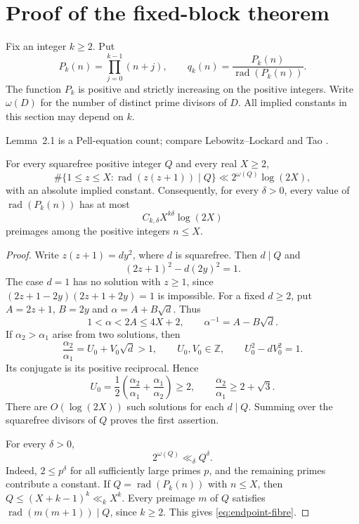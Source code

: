 \section{Proof of the fixed-block theorem}\label{sec:fixed-block}

Fix an integer $k\ge2$. Put
\[
P_k(n)=\prod_{j=0}^{k-1}(n+j),\qquad
q_k(n)=\frac{P_k(n)}{\operatorname{rad}(P_k(n))}.
\]
The function $P_k$ is positive and strictly increasing on the positive
integers. Write $\omega(D)$ for the number of distinct prime divisors of
$D$. All implied constants in this section may depend on $k$.

Lemma~2.1 is a Pell-equation count; compare Lebowitz--Lockard
\cite[Lemma~8]{LL2025} and Tao \cite[Lemma~2.10]{Tao2026}.

\begin{lemma}\label{lem:support-fibre}
For every squarefree positive integer $Q$ and every real $X\ge2$,
\[
\#\{1\le z\le X:\operatorname{rad}(z(z+1))\mid Q\}
\ll 2^{\omega(Q)}\log(2X),
\]
with an absolute implied constant. Consequently, for every $\delta>0$,
every value of $\operatorname{rad}(P_k(n))$ has at most
\begin{equation}\label{eq:endpoint-fibre}
C_{k,\delta}X^{k\delta}\log(2X)
\end{equation}
preimages among the positive integers $n\le X$.
\end{lemma}

\begin{proof}
Write $z(z+1)=dy^2$, where $d$ is squarefree. Then $d\mid Q$ and
\[
(2z+1)^2-d(2y)^2=1.
\]
The case $d=1$ has no solution with $z\ge1$, since
$(2z+1-2y)(2z+1+2y)=1$ is impossible. For a fixed $d\ge2$, put
$A=2z+1$, $B=2y$ and $\alpha=A+B\sqrt d$. Thus
\[
1<\alpha<2A\le4X+2,\qquad \alpha^{-1}=A-B\sqrt d.
\]
If $\alpha_2>\alpha_1$ arise from two solutions, then
\[
\frac{\alpha_2}{\alpha_1}=U_0+V_0\sqrt d>1,
\qquad U_0,V_0\in\mathbb Z,\qquad U_0^2-dV_0^2=1.
\]
Its conjugate is its positive reciprocal. Hence
\[
U_0=\frac12\left(\frac{\alpha_2}{\alpha_1}
                 +\frac{\alpha_1}{\alpha_2}\right)\ge2,
\qquad
\frac{\alpha_2}{\alpha_1}\ge2+\sqrt3.
\]
There are $O(\log(2X))$ such solutions for each $d\mid Q$. Summing over
the squarefree divisors of $Q$ proves the first assertion.

For every $\delta>0$,
\[
2^{\omega(Q)}\ll_\delta Q^\delta.
\]
Indeed, $2\le p^\delta$ for all sufficiently large primes $p$, and the
remaining primes contribute a constant. If
$Q=\operatorname{rad}(P_k(n))$ with $n\le X$, then
$Q\le(X+k-1)^k\ll_k X^k$. Every preimage $m$ of $Q$ satisfies
$\operatorname{rad}(m(m+1))\mid Q$, since $k\ge2$. This gives
\eqref{eq:endpoint-fibre}.
\end{proof}

